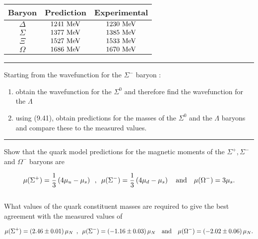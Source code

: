 \begin{table}[tbh!]
    \centering
    \begin{tabular}{c|cc}
    \hline
    Baryon   & Prediction  & Experimental \\ \hline
    $\Delta$ & $1241 \text{ MeV}$ & $1230 \text{ MeV}$  \\
    $\Sigma$ & $1377 \text{ MeV}$ & $1385 \text{ MeV}$  \\
    $\Xi$    & $1527 \text{ MeV}$ & $1533 \text{ MeV}$  \\
    $\Omega$ & $1686 \text{ MeV}$ & $1670 \text{ MeV}$ 
    \end{tabular}
\end{table} \vspace{0.1in}

\noindent\rule{7in}{1.5pt}


\begin{problem}{9.8}
Starting from the wavefunction for the $\Sigma^-$ baryon :

\begin{enumerate}[label=(\alph*)]
    \item obtain the wavefunction for the $\Sigma^0$ and therefore find the wavefunction for the $\Lambda$
    \item using (9.41), obtain predictions for the masses of the $\Sigma^0$ and the $\Lambda$ baryons and compare these to the measured values.
\end{enumerate}
\end{problem}
\begin{solution}

\end{solution}

\noindent\rule{7in}{1.5pt}


\begin{problem}{9.9}
Show that the quark model predictions for the magnetic moments of the $\Sigma^+,\Sigma^-$ and $\Omega^-$ baryons are

\begin{align*}
    \mu(\Sigma^+) = \frac{1}{3} \left( 4\mu_u - \mu_s \right) \hskip0.5em\relax , \hskip0.5em\relax \mu(\Sigma^-) = \frac{1}{3} \left( 4\mu_d - \mu_s \right) \quad \text{and} \quad \mu(\Omega^-) = 3\mu_s .
\end{align*}\\
What values of the quark constituent masses are required to give the best agreement with the measured values of

\begin{align*}
    \mu(\Sigma^+) = \left( 2.46 \pm 0.01 \right) \mu_N  \hskip0.5em\relax , \hskip0.5em\relax \mu(\Sigma^-) = \left( -1.16 \pm 0.03 \right) \mu_N \quad \text{and} \quad \mu(\Omega^-) = \left( -2.02 \pm 0.06 \right)  \mu_N .
\end{align*}
\end{problem}
\begin{solution}

\end{solution}

